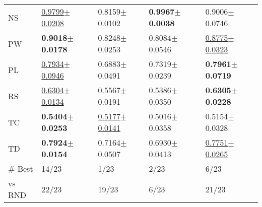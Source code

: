\begin{tabular}{lllll}
NS & \underline{0.9799$\pm$0.0208} & 0.8159$\pm$0.0102 & \textbf{0.9967$\pm$0.0038} & 0.9006$\pm$0.0746 \\
PW & \textbf{0.9018$\pm$0.0178} & 0.8248$\pm$0.0253 & 0.8084$\pm$0.0546 & \underline{0.8775$\pm$0.0323} \\
PL & \underline{0.7934$\pm$0.0946} & 0.6883$\pm$0.0491 & 0.7319$\pm$0.0239 & \textbf{0.7961$\pm$0.0719} \\
RS & \underline{0.6304$\pm$0.0134} & 0.5567$\pm$0.0191 & 0.5386$\pm$0.0350 & \textbf{0.6305$\pm$0.0228} \\
TC & \textbf{0.5404$\pm$0.0253} & \underline{0.5177$\pm$0.0141} & 0.5016$\pm$0.0358 & 0.5154$\pm$0.0328 \\
TD & \textbf{0.7924$\pm$0.0154} & 0.7164$\pm$0.0507 & 0.6930$\pm$0.0413 & \underline{0.7751$\pm$0.0265} \\
\midrule
\# Best & 14/23 & 1/23 & 2/23 & 6/23 \\
vs RND & 22/23 & 19/23 & 6/23 & 21/23 \\
\bottomrule
\end{tabular}
